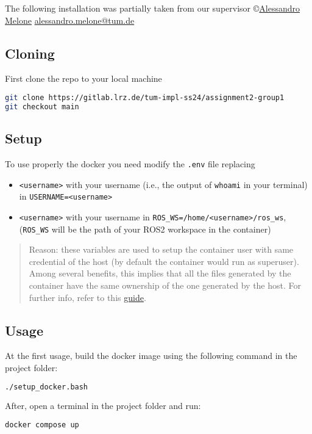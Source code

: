 The following installation was partially taken from our supervisor \copyright \href{https://alessandromelone.github.io/}{Alessandro Melone} \href{mailto:alessandro.melone@tum.de}{alessandro.melone@tum.de}

\subsection{Cloning}
First clone the repo to your local machine
\begin{lstlisting}[language=bash]
git clone https://gitlab.lrz.de/tum-impl-ss24/assignment2-group1
git checkout main
\end{lstlisting}

\subsection{Setup}
To use properly the docker you need modify the \texttt{.env} file replacing
\begin{itemize}
    \item \texttt{<username>} with your username (i.e., the output of \texttt{whoami} in your terminal) in \texttt{USERNAME=<username>}
    \item \texttt{<username>} with your username in \texttt{ROS\_WS=/home/<username>/ros\_ws}, (\texttt{ROS\_WS} will be the path of your ROS2 workspace in the container)
\end{itemize}

\begin{quote}
Reason: these variables are used to setup the container user with same credential of the host (by default the container would run as superuser). Among several benefits, this implies that all the files generated by the container have the same ownership of the one generated by the host. For further info, refer to this \href{https://github.com/joemccann/dillinger}{guide}.
\end{quote}

\subsection{Usage}
At the first usage, build the docker image using the following command in the project folder:
\begin{lstlisting}[language=bash]
./setup_docker.bash
\end{lstlisting}

After, open a terminal in the project folder and run:
\begin{lstlisting}[language=bash]
docker compose up
\end{lstlisting}

